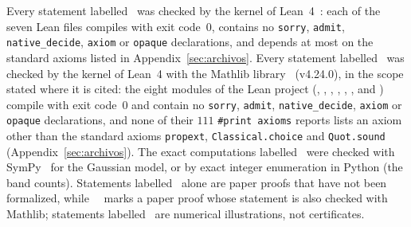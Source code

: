 \documentclass[a4paper,onecolumn,superscriptaddress,10pt,unpublished]{compositionalityarticle}
\begin{document}
Every statement labelled \stL\ was checked by the kernel of Lean~4~\cite{Lean4}: each of the seven Lean files compiles with exit code~0, contains no \texttt{sorry}, \texttt{admit}, \texttt{native\_decide}, \texttt{axiom} or \texttt{opaque} declarations, and depends at most on the standard axioms listed in Appendix~\ref{sec:archivos}. Every statement labelled \stM\ was checked by the kernel of Lean~4 with the Mathlib library~\cite{Mathlib2020} (v4.24.0), in the scope stated where it is cited: the eight modules of the Lean project  (, , , , , ,  and ) compile with exit code~0 and contain no \texttt{sorry}, \texttt{admit}, \texttt{native\_decide}, \texttt{axiom} or \texttt{opaque} declarations, and none of their $111$ \texttt{\#print axioms} reports lists an axiom other than the standard axioms \texttt{propext}, \texttt{Classical.choice} and \texttt{Quot.sound} (Appendix~\ref{sec:archivos}). The exact computations labelled \stS\ were checked with SymPy~\cite{SymPy2017} for the Gaussian model, or by exact integer enumeration in Python (the band counts). Statements labelled \stA\ alone are paper proofs that have not been formalized, while \stA\ \stM\ marks a paper proof whose statement is also checked with Mathlib; statements labelled \stN\ are numerical illustrations, not certificates.

\appendix




\end{document}

